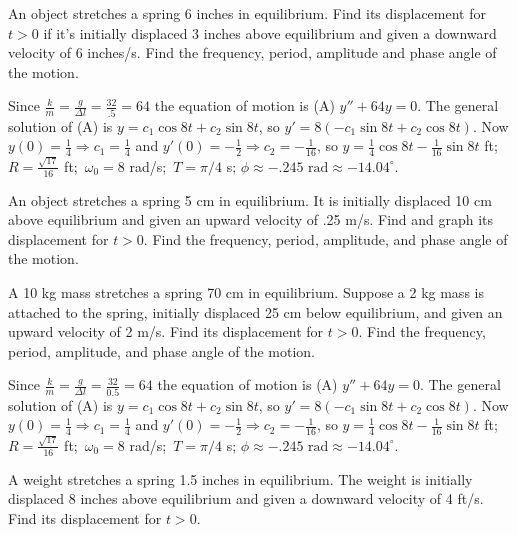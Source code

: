 \documentclass{ximera}
\begin{document}
\begin{problem}\label{exer:6.1.4}
An object stretches a spring 6 inches in equilibrium. Find its
displacement for $t>0$ if it's initially displaced 3 inches above
equilibrium and given a downward velocity of 6 inches/s. Find the
frequency, period, amplitude and phase angle of the motion.

\begin{solution}
Since $\frac{k}{m}=\frac{g}{\Delta l}=\frac{32}{.5}=64$ the
equation of motion is (A) $y''+64y=0$. The general solution of (A) is
$y=c_1\cos8t+c_2\sin8t$, so $y'=8(-c_1\sin8t+c_2\cos8t)$. Now
$y(0)=\frac{1}{4}\Rightarrow c_1=\frac{1}{4}$ and
$y'(0)=-\frac{1}{2}\Rightarrow c_2=-\frac{1}{16}$, so
$y=\frac{1}{4}\cos8t-\frac{1}{16}\sin8t$ ft;\;
$R=\frac{\sqrt{17}}{16}$ ft;\ $\omega_0=8$ rad/s;\ $T=\pi/4$ s;
$\phi\approx-.245\text{ rad}\approx -14.04^\circ$.

\end{solution}
\end{problem}

\begin{problem}\label{exer:6.1.5}
An object stretches a spring 5 cm in equilibrium. It is initially
displaced 10 cm above equilibrium and given an upward velocity of .25
m/s. Find and graph its displacement for $t>0$. Find the frequency,
period, amplitude, and phase angle of the motion.
\end{problem}

\begin{problem}\label{exer:6.1.6}
A 10 kg mass stretches a spring 70 cm in equilibrium. Suppose a 2
kg mass is
attached to the spring, initially displaced 25 cm below equilibrium,
and given an upward velocity of 2 m/s. Find its displacement for
$t>0$. Find the frequency, period, amplitude, and phase angle of the
motion.

\begin{solution}
    Since $\frac{k}{m}=\frac{g}{\Delta l}=\frac{32}{0.5}=64$ the
equation of motion is (A) $y''+64y=0$. The general solution of (A) is
$y=c_1\cos8t+c_2\sin8t$, so $y'=8(-c_1\sin8t+c_2\cos8t)$. Now
$y(0)=\frac{1}{4}\Rightarrow c_1=\frac{1}{4}$ and
$y'(0)=-\frac{1}{2}\Rightarrow c_2=-\frac{1}{16}$, so
$y=\frac{1}{4}\cos8t-\frac{1}{16}\sin8t$ ft;\;
$R=\frac{\sqrt{17}}{16}$ ft;\ $\omega_0=8$ rad/s;\ $T=\pi/4$ s;
$\phi\approx-.245\mbox{ rad}\approx -14.04^\circ$.
\end{solution}
\end{problem}

\begin{problem}\label{exer:6.1.7}
A  weight stretches a spring 1.5 inches in equilibrium. The weight
is initially displaced 8 inches above equilibrium and given a downward
velocity of 4 ft/s. Find its displacement for $t > 0$.
\end{problem}
\end{document}
